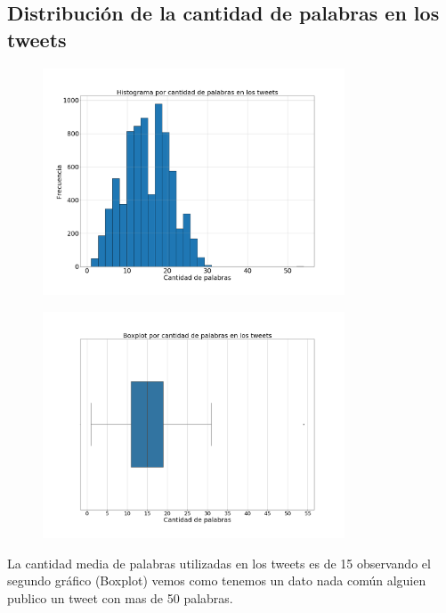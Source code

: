 \documentclass[titlepage,a4paper]{article}
\begin{document}
\subsection{\Large Distribución de la cantidad de palabras en los tweets }
{\Large
\begin{figure}[H]
 \centering
 \includegraphics[width=0.8\textwidth, height=0.8\textheight, keepaspectratio]{graficos/histograma_palabras_tweets_0.png}
\end{figure}
\begin{figure}[H]
 \centering
 \includegraphics[width=0.8\textwidth, height=0.8\textheight, keepaspectratio]{graficos/histograma_palabras_tweets_1.png}
\end{figure}
La cantidad media de palabras utilizadas en los tweets es de 15 observando el segundo gráfico (Boxplot) vemos como tenemos un dato nada común alguien publico un tweet con mas de 50 palabras.
\begin{figure}[H]
 \centering

\end{figure}}
\end{document}
